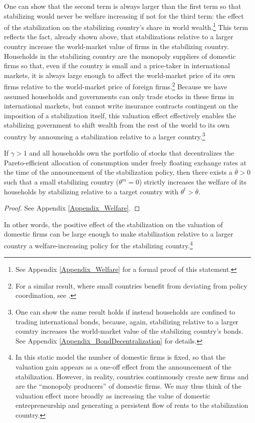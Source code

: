 \documentclass[12pt,letter]{article}
\theoremstyle{break} \theorembodyfont{\normalfont\itshape}
\theoremstyle{break}
\theoremstyle{break} \theorembodyfont{\normalfont\itshape}
\theoremstyle{break} \theorembodyfont{\normalfont\itshape}
\begin{document}
 
One can show that the second term is always larger than the first term
so that stabilizing would never be welfare increasing if not for the
third term: the effect of the stabilization on the stabilizing
country's share in world wealth.\footnote{See Appendix
  \ref{Appendix_Welfare} for a formal proof of this statement.} This
term reflects the fact, already shown above, that stabilizations
relative to a larger country increase the world-market value of firms
in the stabilizing country. Households in the stabilizing country are
the monopoly suppliers of domestic firms so that, even if the country
is small and a price-taker in international markets, it is always
large enough to affect the world-market price of its own firms
relative to the world-market price of foreign firms.\footnote{For a
  similar result, where small countries benefit from deviating from
  policy coordination, see \cite{ChariKehoe1990}.} Because we have
assumed households and governments can only trade stocks in these
firms in international markets, but cannot write insurance contracts
contingent on the imposition of a stabilization itself, this valuation
effect effectively enables the stabilizing government to shift wealth
from the rest of the world to its own country by announcing a
stabilization relative to a larger country.\footnote{One can show the
  same result holds if instead households are confined to trading
  international bonds, because, again, stabilizing relative to a
  larger country increases the world-market value of the stabilizing
  country's bonds. See Appendix \ref{Appendix_BondDecentralization}
  for details.}

\begin{prop}\label{prop_welfare}
  If \(\gamma>1\) and all households own the portfolio of stocks that
  decentralizes the Pareto-efficient allocation of consumption under
  freely floating exchange rates at the time of the announcement of
  the stabilization policy, then there exists a $\overline\theta>0$
  such that a small stabilizing country (\(\theta^m=0\)) strictly
  increases the welfare of its households by stabilizing relative to a
  target country with $\theta^t > \overline\theta.$
\end{prop}
\begin{proof}
  See Appendix \ref{Appendix_Welfare}.
\end{proof}


In other words, the positive effect of the stabilization on the
valuation of domestic firms can be large enough to make stabilization
relative to a larger country a welfare-increasing policy for the
stabilizing country.\footnote{In this static model the number of
  domestic firms is fixed, so that the valuation gain appears as a
  one-off effect from the announcement of the stabilization. However,
  in reality, countries continuously create new firms and are the
  ``monopoly producers'' of domestic firms. We may thus think of the
  valuation effect more broadly as increasing the value of domestic
  entrepreneurship and generating a persistent flow of rents to the
  stabilization country. }
\end{document}
